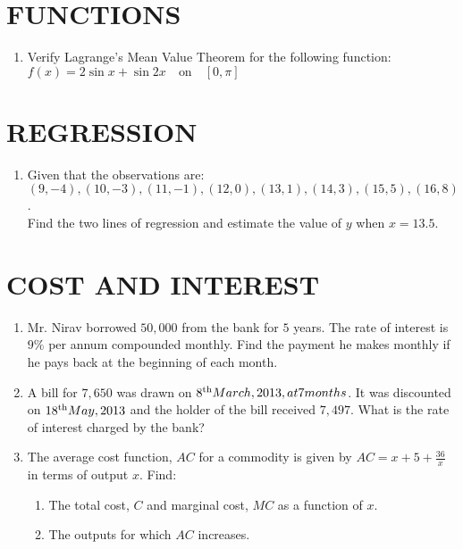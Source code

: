 \documentclass[12pt]{article}
\begin{document}
						\section{FUNCTIONS}
						\begin{enumerate}
							\item  Verify Lagrange's Mean Value Theorem for the following function:\\
								$f(x) = 2\sin x + \sin 2x \quad \text{on} \quad [0, \pi]$
				\end{enumerate}
				\section{REGRESSION}
				\begin{enumerate}
					\item Given that the observations are:
						\\                                $(9, -4), (10, -3), (11, -1), (12, 0), (13, 1), (14, 3), (15, 5), (16, 8)$. \\ 
						Find the two lines of regression and estimate the value of $y$ when $x = 13.5$.
				\end{enumerate}
				\section{COST AND INTEREST}
				\begin{enumerate}
					\item Mr. Nirav borrowed \rupee $50,000$ from the bank for $5$ years. The rate of interest is $9\%$ per annum compounded monthly. Find the payment he makes monthly if he pays back at the beginning of each month.

					\item A bill for \rupee $7,650$ was drawn on $8\textsuperscript{th} March, 2013, at 7 months$. It was discounted on $18\textsuperscript{th} May, 2013$ and the holder of the bill received \rupee $7,497$. What is the rate of interest charged by the bank?
					
					\item The average cost function, $AC$ for a commodity is given by $AC = x + 5 + \frac{36}{x}$ in terms of output $x$. Find: \begin{enumerate}
							[label=\roman*] 
						\item The total cost, $C$ and marginal cost, $MC$ as a function of $x$. 
						\item The outputs for which $AC$ increases. 
				\end{enumerate}
				\end{enumerate}
\end{document}
